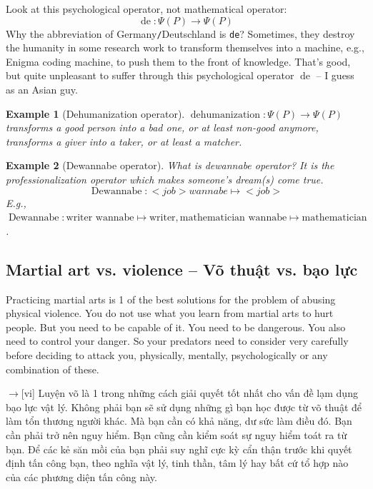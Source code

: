 \documentclass[12pt,oneside]{book}
\newtheorem{example}{Example}
\begin{document}
Look at this psychological operator, not mathematical operator:
\begin{equation}
	\operatorname{de}:\Psi(P)\to\Psi(P)
\end{equation}
Why the abbreviation of Germany{\tt/}Deutschland is {\tt de}? Sometimes, they destroy the humanity in some research work to transform themselves into a machine, e.g., Enigma coding machine, to push them to the front of knowledge. That's good, but quite unpleasant to suffer through this psychological operator $\operatorname{de}$ -- I guess as an Asian guy.

\begin{example}[Dehumanization operator]
	$\operatorname{dehumanization}:\Psi(P)\to\Psi(P)$ transforms a good person into a bad one, or at least non-good anymore, transforms a giver into a taker, or at least a matcher.
\end{example}

\begin{example}[Dewannabe operator]
	What is dewannabe operator? It is the professionalization operator which makes someone's dream(s) come true.
	\begin{equation}
		\operatorname{Dewannabe}: <job> wannabe \mapsto <job>
	\end{equation}
	E.g., $\operatorname{Dewannabe}:\mbox{writer wannabe}\mapsto\mbox{writer},\mbox{mathematician wannabe}\mapsto\mbox{mathematician}$.
\end{example}

\subsection{Martial art vs. violence -- Võ thuật vs. bạo lực}
Practicing martial arts is 1 of the best solutions for the problem of abusing physical violence. You do not use what you learn from martial arts to hurt people. But you need to be capable of it. You need to be dangerous. You also need to control your danger. So your predators need to consider very carefully before deciding to attack you, physically, mentally, psychologically or any combination of these.

{\sf[en]$\to$[vi]} Luyện võ là 1 trong những cách giải quyết tốt nhất cho vấn đề lạm dụng bạo lực vật lý. Không phải bạn sẽ sử dụng những gì bạn học được từ võ thuật để làm tổn thương người khác. Mà bạn cần có khả năng, dư sức làm điều đó. Bạn cần phải trở nên nguy hiểm. Bạn cũng cần kiểm soát sự nguy hiểm toát ra từ bạn. Để các kẻ săn mồi của bạn phải suy nghĩ cực kỳ cẩn thận trước khi quyết định tấn công bạn, theo nghĩa vật lý, tinh thần, tâm lý hay bất cứ tổ hợp nào của các phương diện tấn công này.
\end{document}
